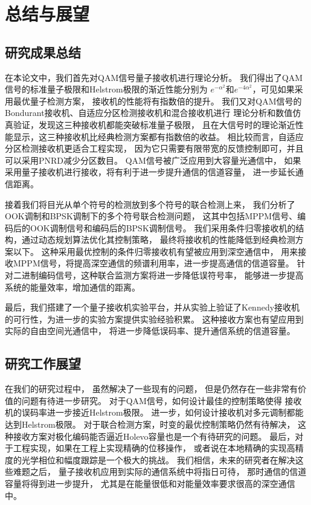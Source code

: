 \chapter{总结与展望}
\section{研究成果总结}
在本论文中，我们首先对QAM信号量子接收机进行理论分析。
我们得出了QAM信号的标准量子极限和Helstrom极限的渐近性能分别为
$e^{-\alpha^2}$和$e^{-4\alpha^2}$，可见如果采用最优量子检测方案，
接收机的性能将有指数倍的提升。
我们又对QAM信号的Bondurant接收机、自适应分区检测接收机和混合接收机进行
理论分析和数值仿真验证，发现这三种接收机都能突破标准量子极限，
且在大信号时的理论渐近性能显示，这三种接收机比经典检测方案都有指数倍的收益。
相比较而言，自适应分区检测接收机更适合工程实现，
因为它只需要有限带宽的反馈控制即可，并且可以采用PNRD减少分区数目。
QAM信号被广泛应用到大容量光通信中，
如果采用量子接收机进行接收，将有利于进一步提升通信的信道容量，
进一步延长通信距离。

接着我们将目光从单个符号的检测放到多个符号的联合检测上来，
我们分析了OOK调制和BPSK调制下的多个符号联合检测问题，
这其中包括MPPM信号、编码后的OOK调制信号和编码后的BPSK调制信号。
我们采用条件归零接收机的结构，通过动态规划算法优化其控制策略，
最终将接收机的性能降低到经典检测方案以下。
这种采用最优控制的条件归零接收机有望被应用到深空通信中，
用来接收MPPM信号，将提高深空通信的频谱利用率，进一步提高通信的信道容量。
针对二进制编码信号，这种联合监测方案将进一步降低误符号率，
能够进一步提高系统的能量效率，增加通信的距离。

最后，我们搭建了一个量子接收机实验平台，并从实验上验证了Kennedy接收机
的可行性，为进一步的实验方案提供实验经验积累。
这种接收方案也有望应用到实际的自由空间光通信中，
将进一步降低误码率、提升通信系统的信道容量。

\section{研究工作展望}
在我们的研究过程中，
虽然解决了一些现有的问题，
但是仍然存在一些非常有价值的问题有待进一步研究。
对于QAM信号，如何设计最佳的控制策略使得
接收机的误码率进一步接近Helstrom极限。
进一步，如何设计接收机对多元调制都能达到Helstrom极限。
对于联合检测方案，时变的最优控制策略仍然有待解决，
这种接收方案对极化编码能否逼近Holevo容量也是一个有待研究的问题。
最后，对于工程实现，如果在工程上实现精确的位移操作，
或者说在本地精确的实现高精度的光学相位和幅度跟踪是一个极大的挑战。
我们相信，未来的研究者在解决这些难题之后，
量子接收机应用到实际的通信系统中将指日可待，
那时通信的信道容量将得到进一步提升，
尤其是在能量很低和对能量效率要求很高的深空通信中。


